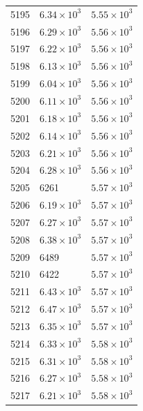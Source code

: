 \begin{table}[H]
\begin{tabular}{lll}
5195 & $\displaystyle 6.34 \times 10^{3}$ & $\displaystyle 5.55 \times 10^{3}$ \\
5196 & $\displaystyle 6.29 \times 10^{3}$ & $\displaystyle 5.56 \times 10^{3}$ \\
5197 & $\displaystyle 6.22 \times 10^{3}$ & $\displaystyle 5.56 \times 10^{3}$ \\
5198 & $\displaystyle 6.13 \times 10^{3}$ & $\displaystyle 5.56 \times 10^{3}$ \\
5199 & $\displaystyle 6.04 \times 10^{3}$ & $\displaystyle 5.56 \times 10^{3}$ \\
5200 & $\displaystyle 6.11 \times 10^{3}$ & $\displaystyle 5.56 \times 10^{3}$ \\
5201 & $\displaystyle 6.18 \times 10^{3}$ & $\displaystyle 5.56 \times 10^{3}$ \\
5202 & $\displaystyle 6.14 \times 10^{3}$ & $\displaystyle 5.56 \times 10^{3}$ \\
5203 & $\displaystyle 6.21 \times 10^{3}$ & $\displaystyle 5.56 \times 10^{3}$ \\
5204 & $\displaystyle 6.28 \times 10^{3}$ & $\displaystyle 5.56 \times 10^{3}$ \\
5205 & 6261 & $\displaystyle 5.57 \times 10^{3}$ \\
5206 & $\displaystyle 6.19 \times 10^{3}$ & $\displaystyle 5.57 \times 10^{3}$ \\
5207 & $\displaystyle 6.27 \times 10^{3}$ & $\displaystyle 5.57 \times 10^{3}$ \\
5208 & $\displaystyle 6.38 \times 10^{3}$ & $\displaystyle 5.57 \times 10^{3}$ \\
5209 & 6489 & $\displaystyle 5.57 \times 10^{3}$ \\
5210 & 6422 & $\displaystyle 5.57 \times 10^{3}$ \\
5211 & $\displaystyle 6.43 \times 10^{3}$ & $\displaystyle 5.57 \times 10^{3}$ \\
5212 & $\displaystyle 6.47 \times 10^{3}$ & $\displaystyle 5.57 \times 10^{3}$ \\
5213 & $\displaystyle 6.35 \times 10^{3}$ & $\displaystyle 5.57 \times 10^{3}$ \\
5214 & $\displaystyle 6.33 \times 10^{3}$ & $\displaystyle 5.58 \times 10^{3}$ \\
5215 & $\displaystyle 6.31 \times 10^{3}$ & $\displaystyle 5.58 \times 10^{3}$ \\
5216 & $\displaystyle 6.27 \times 10^{3}$ & $\displaystyle 5.58 \times 10^{3}$ \\
5217 & $\displaystyle 6.21 \times 10^{3}$ & $\displaystyle 5.58 \times 10^{3}$ \\

\end{tabular}
\end{table}
